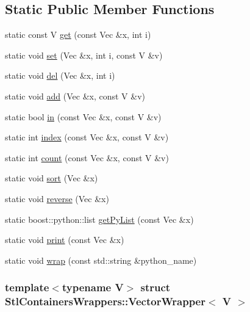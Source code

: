 \subsection*{Static Public Member Functions}
\begin{DoxyCompactItemize}
\item 
static const V \hyperlink{struct_stl_containers_wrappers_1_1_vector_wrapper_a1b0e383dae79f32239a863cf7398f267}{get} (const Vec \&x, int i)
\item 
static void \hyperlink{struct_stl_containers_wrappers_1_1_vector_wrapper_ab1fe165b0421a3621901c8cec68079ea}{set} (Vec \&x, int i, const V \&v)
\item 
static void \hyperlink{struct_stl_containers_wrappers_1_1_vector_wrapper_a40311c89e3818c22ad283161f0417bca}{del} (Vec \&x, int i)
\item 
static void \hyperlink{struct_stl_containers_wrappers_1_1_vector_wrapper_a1e74442e7917385090e381ba20413389}{add} (Vec \&x, const V \&v)
\item 
static bool \hyperlink{struct_stl_containers_wrappers_1_1_vector_wrapper_a3b81b39869a283c7879e928c0e5718ee}{in} (const Vec \&x, const V \&v)
\item 
static int \hyperlink{struct_stl_containers_wrappers_1_1_vector_wrapper_a9b0dd780822b82e7c04648a54d1700b2}{index} (const Vec \&x, const V \&v)
\item 
static int \hyperlink{struct_stl_containers_wrappers_1_1_vector_wrapper_a3449d24986cb6bd5ca927a32aaaef065}{count} (const Vec \&x, const V \&v)
\item 
static void \hyperlink{struct_stl_containers_wrappers_1_1_vector_wrapper_a874fe836ed959b33fafef319cfd7305d}{sort} (Vec \&x)
\item 
static void \hyperlink{struct_stl_containers_wrappers_1_1_vector_wrapper_affef01a389d364fe81de5bb7234b8b4b}{reverse} (Vec \&x)
\item 
static boost::python::list \hyperlink{struct_stl_containers_wrappers_1_1_vector_wrapper_a4afc777d4230a26d5070ec4d542e7d36}{getPyList} (const Vec \&x)
\item 
static void \hyperlink{struct_stl_containers_wrappers_1_1_vector_wrapper_ac25e1d43171eafc2862605115b33ca9f}{print} (const Vec \&x)
\item 
static void \hyperlink{struct_stl_containers_wrappers_1_1_vector_wrapper_aadf4c7914637ece3c5704482b1db8763}{wrap} (const std::string \&python\_\-name)
\end{DoxyCompactItemize}
\subsubsection*{template$<$typename V$>$ struct StlContainersWrappers::VectorWrapper$<$ V $>$}



